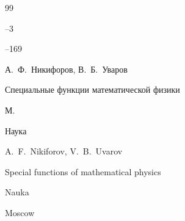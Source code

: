 \begin{thebibliography}{99}


--3

--169










\by А.~Ф.~Никифоров, В.~Б.~Уваров

\book Специальные функции математической физики

\publaddr М.

\publ Наука



\misctransl

\by A.~F.~Nikiforov, V.~B.~Uvarov 

\book Special functions of mathematical physics

\publ Nauka

\publaddr Moscow





\end{thebibliography}



\noindent

\hskip6.5cm \thedate \par\noindent

\hskip6.5cm\therevdate

%





\newpage








\makeengtitlem







\newpage

%


%

%

